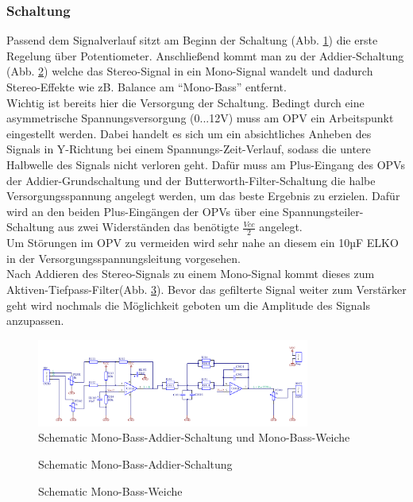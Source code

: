 \subsubsection{Schaltung}
Passend dem Signalverlauf sitzt am Beginn der Schaltung (Abb. \ref{fig:abb3.2}) die erste Regelung über Potentiometer. Anschließend kommt man zu der Addier-Schaltung (Abb. \ref{fig:abb3.3}) welche das Stereo-Signal in ein Mono-Signal wandelt und dadurch Stereo-Effekte wie zB. Balance am \enquote{Mono-Bass} entfernt.\\
Wichtig ist bereits hier die Versorgung der Schaltung. Bedingt durch eine asymmetrische Spannungsversorgung (0...12V) muss am OPV ein Arbeitspunkt eingestellt werden. Dabei handelt es sich um ein absichtliches Anheben des Signals in Y-Richtung bei einem Spannungs-Zeit-Verlauf, sodass die untere Halbwelle des Signals nicht verloren geht. Dafür muss am Plus-Eingang des OPVs der Addier-Grundschaltung und der Butterworth-Filter-Schaltung die halbe Versorgungsspannung angelegt werden, um das beste Ergebnis zu erzielen. Dafür wird an den beiden Plus-Eingängen der OPVs über eine Spannungsteiler-Schaltung aus zwei Widerständen das benötigte $\frac{Vcc}{2}$ angelegt.\\
Um Störungen im OPV zu vermeiden wird sehr nahe an diesem ein 10µF ELKO in der Versorgungsspannungsleitung vorgesehen.\\
Nach Addieren des Stereo-Signals zu einem Mono-Signal kommt dieses zum Aktiven-Tiefpass-Filter(Abb. \ref{fig:abb3.4}). Bevor das gefilterte Signal weiter zum Verstärker geht wird nochmals die Möglichkeit geboten um die Amplitude des Signals anzupassen.
\begin{figure} [h]
	\centering
	\caption{Schematic Mono-Bass-Addier-Schaltung und Mono-Bass-Weiche}
	\label {fig:abb3.2}
	\includegraphics[width=0.8\textwidth]{img/3mTTWeicheruAddiererDiplSchematic.PNG}
\end{figure}
\begin{figure} [h]
	\centering
	\caption{Schematic Mono-Bass-Addier-Schaltung}
	\label {fig:abb3.3}
\end{figure}
\begin{figure} [h]
	\centering
	\caption{Schematic Mono-Bass-Weiche}
	\label {fig:abb3.4}
\end{figure}



